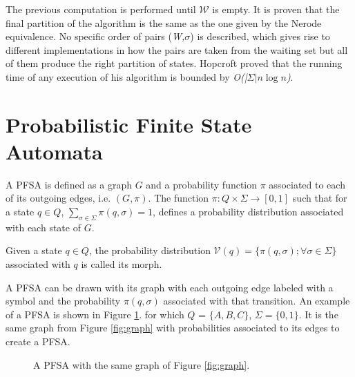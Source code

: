 {The previous computation is performed until $\mathcal{W}$ is empty. It is proven that the final partition of the algorithm is the same as the one given by the Nerode equivalence. No specific order of pairs (\textit{W,$\sigma$}) is described, which gives rise to different implementations in how the pairs are taken from the waiting set but all of them produce the right partition of states. Hopcroft proved that the running time of any execution of his algorithm is bounded by \textit{O(|$\Sigma| n\log n$)}.

\section{Probabilistic Finite State Automata}

\begin{definition}\label{definition:pfsa}
A PFSA is defined as a graph $G$ and a probability function $\pi$ associated to each of its outgoing edges, i.e. $(G, \pi)$. The function $\pi: Q\times\Sigma \rightarrow [0,1]$ such that for a state $q \in Q$, $\sum\limits_{\sigma\in\Sigma}\pi(q,\sigma) = 1$, defines a probability distribution associated with each state of $G$.
\end{definition} 

\begin{definition}\label{definition:morph}
Given a state $q \in Q$, the probability distribution $\mathcal{V}(q) = \{ \pi(q, \sigma); \forall \sigma \in \Sigma\}$ associated with $q$ is called its morph.  
\end{definition}

A PFSA can be drawn with its graph with each outgoing edge labeled with a symbol and the probability $\pi(q,\sigma)$ associated with that transition. An example of a PFSA is shown in Figure \ref{fig:pfsa}. for which $Q$ = $\{A, B, C\}$, $\Sigma = \{0, 1\}$. It is the same graph from Figure \ref{fig:graph} with probabilities associated to its edges to create a PFSA.

\begin{figure}
\centering
{}
\caption{A PFSA with the same graph of Figure \ref{fig:graph}.\label{fig:pfsa}}
\end{figure}

}
